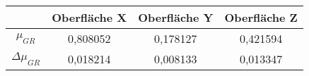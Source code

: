 \begin{tabular}{c|c|c|c}
    \space & Oberfläche X & Oberfläche Y & Oberfläche Z \\ \hline
    $\mu_{GR}$ & 0,808052 & 0,178127 & 0,421594 \\
    $\Delta \mu_{GR}$ & 0,018214 & 0,008133 & 0,013347
\end{tabular}